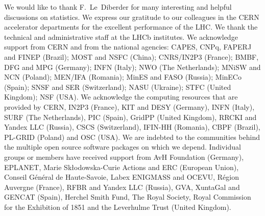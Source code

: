 \documentclass[12pt,a4paper]{article}
\begin{document}
\noindent We would like to thank F.~Le~Diberder for many interesting and helpful discussions on statistics.
We express our gratitude to our colleagues in the CERN
accelerator departments for the excellent performance of the LHC. We
thank the technical and administrative staff at the LHCb
institutes. We acknowledge support from CERN and from the national
agencies: CAPES, CNPq, FAPERJ and FINEP (Brazil); MOST and NSFC (China);
CNRS/IN2P3 (France); BMBF, DFG and MPG (Germany); INFN (Italy);
NWO (The Netherlands); MNiSW and NCN (Poland); MEN/IFA (Romania);
MinES and FASO (Russia); MinECo (Spain); SNSF and SER (Switzerland);
NASU (Ukraine); STFC (United Kingdom); NSF (USA).
We acknowledge the computing resources that are provided by CERN, IN2P3 (France), KIT and DESY (Germany), INFN (Italy), SURF (The Netherlands), PIC (Spain), GridPP (United Kingdom), RRCKI and Yandex LLC (Russia), CSCS (Switzerland), IFIN-HH (Romania), CBPF (Brazil), PL-GRID (Poland) and OSC (USA). We are indebted to the communities behind the multiple open
source software packages on which we depend.
Individual groups or members have received support from AvH Foundation (Germany),
EPLANET, Marie Sk\l{}odowska-Curie Actions and ERC (European Union),
Conseil G\'{e}n\'{e}ral de Haute-Savoie, Labex ENIGMASS and OCEVU,
R\'{e}gion Auvergne (France), RFBR and Yandex LLC (Russia), GVA, XuntaGal and GENCAT (Spain), Herchel Smith Fund, The Royal Society, Royal Commission for the Exhibition of 1851 and the Leverhulme Trust (United Kingdom). 


\end{document}
